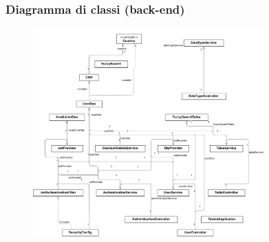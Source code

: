 \documentclass{beamer}
\begin{document}
\begin{frame}
  \frametitle{Diagramma di classi (back-end)}
  \begin{figure}
    \includegraphics[height=8cm]{classes}
  \end{figure}
\end{frame}
\end{document}
